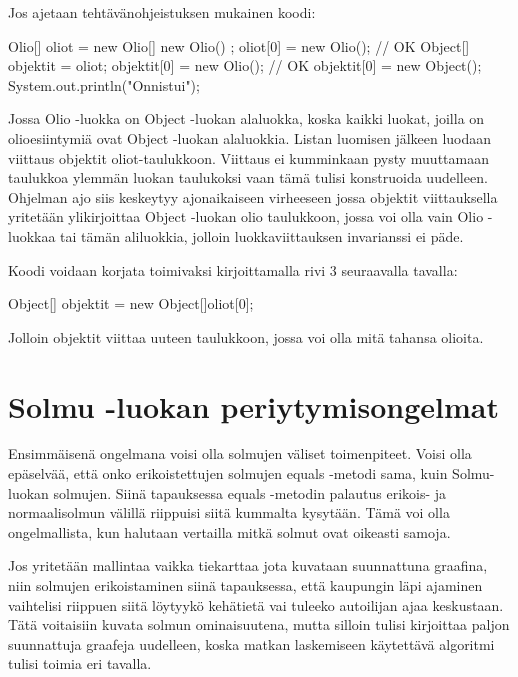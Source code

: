 \label{}

Jos ajetaan tehtävänohjeistuksen mukainen koodi:

\begin{javacode}
Olio[] oliot = new Olio[] { new Olio() };
oliot[0] = new Olio(); // OK
Object[] objektit = oliot;
objektit[0] = new Olio(); // OK 
objektit[0] = new Object();
System.out.println("Onnistui");
\end{javacode}

Jossa Olio -luokka on Object -luokan alaluokka, koska kaikki luokat, joilla on
olioesiintymiä ovat Object -luokan alaluokkia. Listan luomisen jälkeen luodaan
viittaus objektit oliot-taulukkoon. Viittaus ei kumminkaan pysty muuttamaan
taulukkoa ylemmän luokan taulukoksi vaan tämä tulisi konstruoida uudelleen.
Ohjelman ajo siis keskeytyy ajonaikaiseen virheeseen jossa objektit
viittauksella yritetään ylikirjoittaa Object -luokan olio taulukkoon, jossa voi
olla vain Olio -luokkaa tai tämän aliluokkia, jolloin luokkaviittauksen
invarianssi ei päde.

Koodi voidaan korjata toimivaksi kirjoittamalla rivi 3 seuraavalla tavalla:

\begin{javacode}
Object[] objektit = new Object[]{oliot[0]};
\end{javacode}

Jolloin objektit viittaa uuteen taulukkoon, jossa voi olla mitä tahansa olioita.

\section{Solmu -luokan periytymisongelmat}

\label{}

Ensimmäisenä ongelmana voisi olla solmujen väliset toimenpiteet. Voisi olla
epäselvää, että onko erikoistettujen solmujen equals -metodi sama, kuin Solmu-
luokan solmujen. Siinä tapauksessa equals -metodin palautus erikois- ja
normaalisolmun välillä riippuisi siitä kummalta kysytään. Tämä voi olla
ongelmallista, kun halutaan vertailla mitkä solmut ovat oikeasti samoja.

Jos yritetään mallintaa vaikka tiekarttaa jota kuvataan suunnattuna graafina,
niin solmujen erikoistaminen siinä tapauksessa, että kaupungin läpi ajaminen
vaihtelisi riippuen siitä löytyykö kehätietä vai tuleeko autoilijan ajaa
keskustaan. Tätä voitaisiin kuvata solmun ominaisuutena, mutta silloin tulisi
kirjoittaa paljon suunnattuja graafeja uudelleen, koska matkan laskemiseen
käytettävä algoritmi tulisi toimia eri tavalla.

